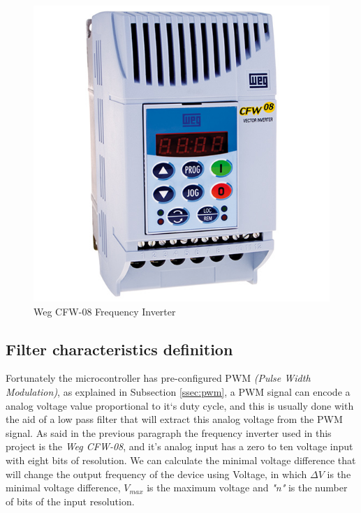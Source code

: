 		\begin{figure}[htbp]
			\centering
				\includegraphics[scale=0.4]{figuras/fig-wegCFW08}
			\caption{Weg CFW-08 Frequency Inverter \cite{fig-wegCFW08}}
			\label{fig:wegCFW08}
		\end{figure}

	\subsection{Filter characteristics definition}\label{ssec:filterCharacteristicsDefinition}
		\par
		Fortunately the microcontroller has pre-configured PWM \textit{(Pulse Width Modulation)}, as explained in Subsection \ref{ssec:pwm}, a PWM signal can encode a analog voltage value proportional to it`s duty cycle, and this is usually done with the aid of a low pass filter that will extract this analog voltage from the PWM signal. As said in the previous paragraph the frequency inverter used in this project is the \textit{Weg CFW-08}, and it's analog input has a zero to ten voltage input with eight bits of resolution. We can calculate the minimal voltage difference that will change the output frequency of the device using Voltage, in which $\Delta V$ is the minimal voltage difference, $V_{max}$ is the maximum voltage and \textit{"n"} is the number of bits of the input resolution.


